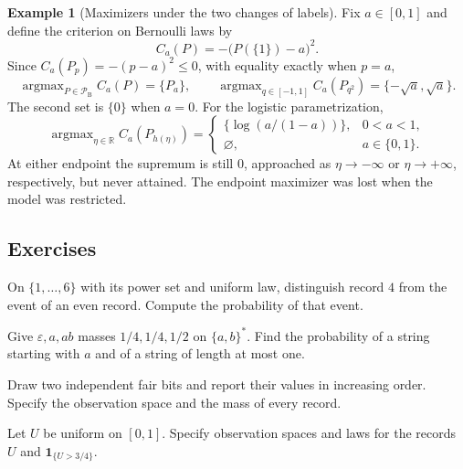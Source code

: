 \documentclass[11pt,oneside]{book}
\theoremstyle{definition}
\newtheorem{example}[theorem]{Example}
\theoremstyle{remark}
\DeclareMathOperator{\argmax}{argmax}
\newcommand{\R}{\mathbb R}
\begin{document}
\begin{example}[Maximizers under the two changes of labels]
\label{ex:maximizers}
Fix $a\in[0,1]$ and define the criterion on Bernoulli laws by
\[
C_a(P)=-\bigl(P(\{1\})-a\bigr)^2.
\]
Since $C_a(P_p)=-(p-a)^2\leq0$, with equality exactly when $p=a$,
\[
\argmax_{P\in\mathcal P_{\mathrm B}}C_a(P)=\{P_a\},\qquad
\argmax_{q\in[-1,1]}C_a(P_{q^2})=\{-\sqrt a,\sqrt a\}.
\]
The second set is $\{0\}$ when $a=0$.
For the logistic parametrization,
\[
\argmax_{\eta\in\R}C_a(P_{h(\eta)})
=
\begin{cases}
\{\log(a/(1-a))\},&0<a<1,\\
\varnothing,&a\in\{0,1\}.
\end{cases}
\]
At either endpoint the supremum is still $0$, approached as
$\eta\to-\infty$ or $\eta\to+\infty$, respectively, but never attained.
The endpoint maximizer was lost when the model was restricted.
\end{example}

\subsection{Exercises}
\label{subsec:worked-examples-1-1}

\begin{practiceexercise}
\label{wex:die-record}
On $\{1,\ldots,6\}$ with its power set and uniform law, distinguish record
$4$ from the event of an even record. Compute the probability of that event.
\end{practiceexercise}

\begin{practiceexercise}
\label{wex:prefix-event}
Give $\varepsilon,a,ab$ masses $1/4,1/4,1/2$ on $\{a,b\}^*$. Find the
probability of a string starting with $a$ and of a string of length at most
one.
\end{practiceexercise}

\begin{practiceexercise}
\label{wex:unordered-pair-space}
Draw two independent fair bits and report their values in increasing order.
Specify the observation space and the mass of every record.
\end{practiceexercise}

\begin{practiceexercise}
\label{wex:threshold-report-space}
Let $U$ be uniform on $[0,1]$. Specify observation spaces and laws for the
records $U$ and $\mathbf1_{\{U>3/4\}}$.
\end{practiceexercise}
\end{document}
